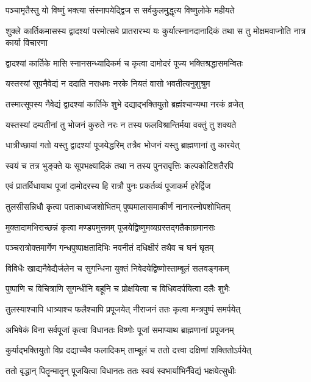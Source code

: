 \twolineshloka
{पञ्चामृतैस्तु यो विष्णुं भक्त्या संस्नापयेद्द्विज}
{स सर्वकुलमुद्धृत्य विष्णुलोके महीयते} %

\threelineshloka
{शुक्ले कार्तिकमासस्य द्वादश्यां परमोत्सवे}
{प्रातरारभ्य यः कुर्यात्स्नानदानादिकं तथा}
{स तु मोक्षमवाप्नोति नात्र कार्या विचारणा} %

\twolineshloka
{द्वादश्यां कार्तिके मासि स्नानसन्ध्यादिकर्म च}
{कृत्वा दामोदरं पूज्य भक्तिश्रद्धासमन्वितः} %

\twolineshloka
{यस्तस्यां सूपनैवेद्यं न ददाति नराधमः}
{नरके नियतं वासो भवतीत्यनुशुश्रुम} %

\twolineshloka
{तस्मात्सूपस्य नैवेद्यं द्वादश्यां कार्तिके शुभे}
{दद्याद्भक्तियुतो ब्रह्मंश्चान्यथा नरकं व्रजेत्} %

\twolineshloka
{यस्तस्यां दम्पतीनां तु भोजनं कुरुते नरः}
{न तस्य फलविश्रान्तिर्मया वक्तुं तु शक्यते} %

\twolineshloka
{धात्रीच्छायां गतो यस्तु द्वादश्यां पूजयेद्धरिम्}
{तत्रैव भोजनं यस्तु ब्राह्मणानां तु कारयेत्} %

\twolineshloka
{स्वयं च तत्र भुङ्क्ते यः सूपभक्ष्यादिकं तथा}
{न तस्य पुनरावृत्तिः कल्पकोटिशतैरपि} %

\twolineshloka
{एवं प्रातर्विधायाथ पूजां दामोदरस्य हि}
{रात्रौ पुनः प्रकर्तव्यं पूजाकर्म हरेर्द्विज} %

\twolineshloka
{तुलसीसन्निधौ कृत्वा पताकाध्वजशोभितम्}
{पुष्पमालासमाकीर्णं नानारत्नोपशोभितम्} %

\twolineshloka
{मुक्तादामभिराच्छन्नं कृत्वा मण्डपमुत्तमम्}
{पूजयेद्विष्णुमव्यग्रस्तद्गतैकाग्रमानसः} %

\twolineshloka
{पञ्चरात्रोक्तमार्गेण गन्धपुष्पाक्षतादिभिः}
{नवनीतं दधिक्षीरं तथैव च घनं घृतम्} %

\twolineshloka
{विविधैः खाद्यनैवेद्यैर्जलेन च सुगन्धिना}
{युक्तं निवेदयेद्विष्णोस्ताम्बूलं सलवङ्गकम्} %

\twolineshloka
{पुष्पाणि च विचित्राणि सुगन्धीनि बहूनि च}
{प्रोक्षयित्वा च विधिवदर्पयित्वा दलैः शुभैः} %

\twolineshloka
{तुलस्याश्चापि धात्र्याश्च फलैश्चापि प्रपूजयेत्}
{नीराजनं ततः कृत्वा मन्त्रपुष्पं समर्पयेत्} %

\twolineshloka
{अभिषेकं विना सर्वपूजां कृत्वा विधानतः}
{विष्णोः पूजां समाप्याथ ब्राह्मणानां प्रपूजनम्} %

\twolineshloka
{कुर्याद्भक्तियुतो विप्र दद्याच्चैव फलादिकम्}
{ताम्बूलं च ततो दत्त्वा दक्षिणां शक्तितोऽर्पयेत्} %

\twolineshloka
{ततो वृद्धान् पितॄन्मातॄन् पूजयित्वा विधानतः}
{ततः स्वयं स्वभार्याभिर्नैवेद्यं भक्षयेत्सुधीः} %

